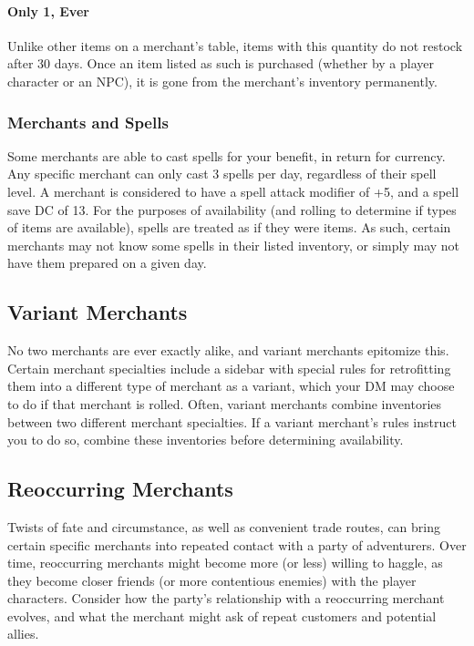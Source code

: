 \documentclass[10pt,a4paper,twoside,twocolumn,openany,nodeprecatedcode,bg=print]{dndbook}
\begin{document}
\paragraph{Only 1, Ever}
Unlike other items on a merchant's table, items with this quantity do not restock after 30 days. Once an item listed as such is purchased (whether by a player character or an NPC), it is gone from the merchant's inventory permanently.
\subsubsection{Merchants and Spells}
Some merchants are able to cast spells for your benefit, in return for currency. Any specific merchant can only cast 3 spells per day, regardless of their spell level. A merchant is considered to have a spell attack modifier of +5, and a spell save DC of 13.
For the purposes of availability (and rolling to determine if types of items are available), spells are treated as if they were items. As such, certain merchants may not know some spells in their listed inventory, or simply may not have them prepared on a given day.
\subsection{Variant Merchants}
No two merchants are ever exactly alike, and variant merchants epitomize this. Certain merchant specialties include a sidebar with special rules for retrofitting them into a different type of merchant as a variant, which your DM may choose to do if that merchant is rolled.
Often, variant merchants combine inventories between two different merchant specialties. If a variant merchant's rules instruct you to do so, combine these inventories before determining availability.
\subsection{Reoccurring Merchants}
Twists of fate and circumstance, as well as convenient trade routes, can bring certain specific merchants into repeated contact with a party of adventurers.
Over time, reoccurring merchants might become more (or less) willing to haggle, as they become closer friends (or more contentious enemies) with the player characters. Consider how the party's relationship with a reoccurring merchant evolves, and what the merchant might ask of repeat customers and potential allies.
\end{document}
